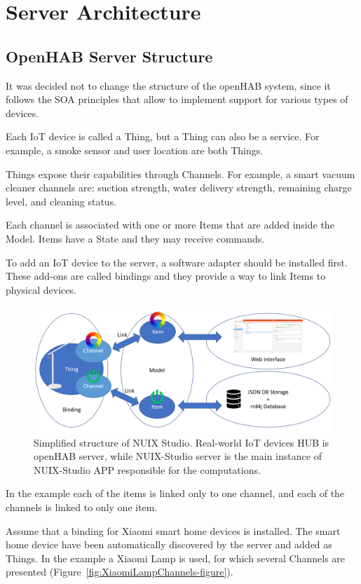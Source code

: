 \section{Server Architecture}
\subsection{OpenHAB Server Structure}


It was decided not to change the structure of the openHAB system, since it follows the SOA principles that allow to implement support for various types of devices.

Each IoT device is called a Thing, but a Thing can also be a service. For example, a smoke sensor and user location are both Things.

Things expose their capabilities through Channels. For example, a smart vacuum cleaner channels are: suction strength, water delivery strength, remaining charge level, and cleaning status. 

Each channel is associated with one or more Items that are added inside the Model. Items have a State and they may receive commands. 

To add an IoT device to the server, a software adapter should be installed first. These add-ons are called bindings and they provide a way to link Items to physical devices.

\begin{figure}
  \centering
  \includegraphics[width=0.9\linewidth]{figures/openHABServerStructure.png}
  \caption{Simplified structure of NUIX Studio. Real-world IoT devices HUB is openHAB server, while NUIX-Studio server is the main instance of NUIX-Studio APP responsible for the computations.}
  \label{fig:openHABServerStructure-figure}
\end{figure}

In the example each of the items is linked only to one channel, and each of the channels is linked to only one item. 

Assume that a binding for Xiaomi smart home devices is installed. The smart home device have been automatically discovered by the server and added as Things. In the example a Xiaomi Lamp is used, for which several Channels are presented (Figure~\ref{fig:XiaomiLampChannels-figure}).

